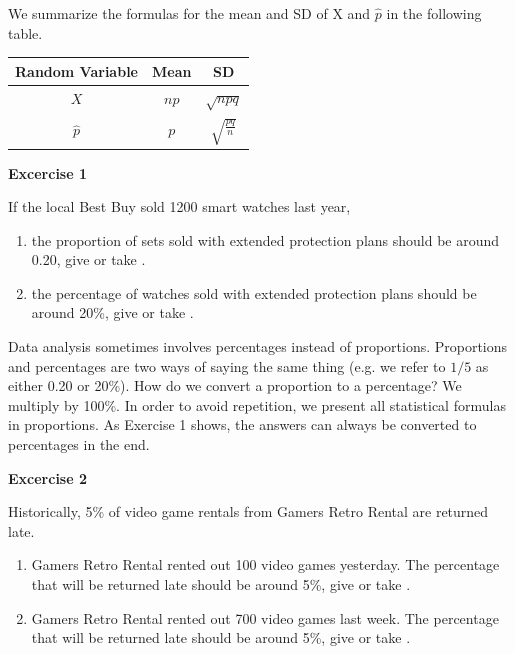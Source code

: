 \documentclass[11pt, chapterprefix=true]{scrbook}\usepackage[]{graphicx}\usepackage[]{color}
\begin{document}
We summarize the formulas for the mean and SD of X and $\hat{p}$ in the following table.

\begin{table}[ht]
\centering
\begin{tabular}{@{} ccc @{}} \hline
Random Variable & Mean & SD \\ \hline
$X$ & $np$ & $\sqrt{npq}$ \\
$\hat{p}$ & $p$ & $\sqrt{\frac{pq}{n}}$  \\ \hline
\end{tabular}
\end{table}


\begin{minipage}[ht]{3cm}

\vspace{-31mm}

\textbf{Excercise 1}
\end{minipage}
\begin{minipage}[ht]{11cm}

\parbox{11cm}{
If the local Best Buy sold 1200 smart watches last year,

\begin{enumerate}
\item the proportion of sets sold with extended protection plans should be around 0.20, give or take \underline{\phantom{xxxxxxxx}}.
\item the percentage of watches sold with extended protection plans should be around 20\%, give or take \underline{\phantom{xxxxxxxx}}.
\end{enumerate}
}
\end{minipage}

Data analysis sometimes involves percentages instead of proportions.  Proportions and percentages are two ways of saying the same thing (e.g. we refer to $1/5$ as either 0.20 or 20\%).  How do we convert a proportion to a percentage?  We multiply by 100\%.  In order to avoid repetition, we present all statistical formulas in proportions.  As Exercise 1 shows, the answers can always be converted to percentages in the end.

\begin{minipage}[ht]{3cm}

\vspace{-45mm}

\textbf{Excercise 2}
\end{minipage}
\begin{minipage}[ht]{11cm}

\parbox{11cm}{
Historically, 5\% of video game rentals from Gamers Retro Rental are returned late.

\begin{enumerate}
\item Gamers Retro Rental rented out 100 video games yesterday.  The percentage that will be returned late should be around 5\%, give or take \underline{\phantom{xxxxxxx}}.
\item Gamers Retro Rental rented out 700 video games last week.  The percentage that will be returned late should be around 5\%, give or take \underline{\phantom{xxxxxxx}}.
\end{enumerate}
}
\end{minipage}
\end{document}
